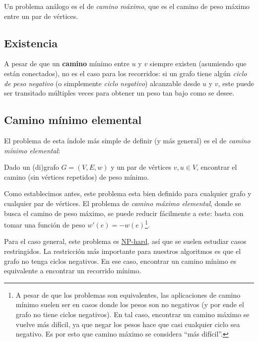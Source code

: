 \documentclass[a4paper]{report}
\begin{document}
Un problema análogo es el de \textit{camino máximo}, que es el camino de peso máximo entre un par de vértices.

\subsection{Existencia}

A pesar de que un \textbf{camino} mínimo entre $u$ y $v$ siempre existen (asumiendo que están conectados), no es el caso para los recorridos: si un grafo tiene algún \textit{ciclo de peso negativo} (o simplemente \textit{ciclo negativo}) alcanzable desde $u$ y $v$, este puede ser transitado múltiples veces para obtener un peso tan bajo como se desee.

\subsection{Camino mínimo elemental}

El problema de esta índole más simple de definir (y más general) es el de \textit{camino mínimo elemental}:

\begin{problema}
    Dado un (di)grafo $G = (V, E, w)$ y un par de vértices $v, u \in V$, encontrar el camino (sin vértices repetidos) de peso mínimo.
\end{problema}

Como establecimos antes, este problema esta bien definido para cualquier grafo y cualquier par de vértices. El problema de \textit{camino máximo elemental}, donde se busca el camino de peso máximo, se puede reducir fácilmente a este: basta con tomar una función de peso $w'(e) = -w(e)$\footnote{A pesar de que los problemas son equivalentes, las aplicaciones de camino mínimo suelen ser en casos donde los pesos son no negativos (y por ende el grafo no tiene ciclos negativos). En tal caso, encontrar un camino máximo se vuelve más difícil, ya que negar los pesos hace que casi cualquier ciclo sea negativo. Es por esto que camino máximo se considera ``más difícil''.}.

Para el caso general, este problema es \hyperref[np-hard]{NP-hard}, así que se suelen estudiar casos restringidos. La restricción más importante para nuestros algoritmos es que el grafo no tenga ciclos negativos. En ese caso, encontrar un camino mínimo es equivalente a encontrar un recorrido mínimo.
\end{document}
